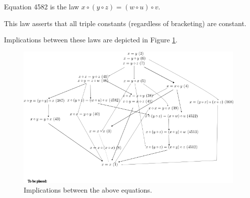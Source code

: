 \begin{definition}[Equation 4582]\label{eq4582}\leanok{}  Equation 4582 is the law $x \circ (y \circ z) = (w \circ u) \circ v$.
\end{definition}

This law asserts that all triple constants (regardless of bracketing) are constant.

Implications between these laws are depicted in Figure \ref{fig:implications}.

\begin{figure}
  \centering
  \includegraphics[width=0.5\linewidth]{../../images/implications.png}
  \caption{Implications between the above equations.}
  \label{fig:implications}
\end{figure}
